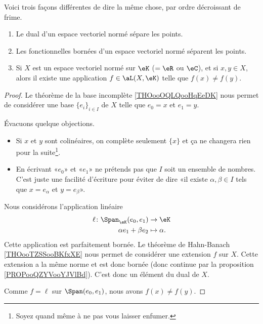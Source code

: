 \begin{corollary}        \label{CORooOBDHooJpiBrs}
	Voici trois façons différentes de dire la même chose, par ordre décroissant de frime.
	\begin{enumerate}
		\item
		      Le dual d'un espace vectoriel normé sépare les points.
		\item
		      Les fonctionnelles bornées d'un espace vectoriel normé séparent les points.
		\item
		      Si \( X\) est un espace vectoriel normé sur \( \eK\) (\( =\eR\) ou \( \eC\)), et si \( x,y\in X\), alors il existe une application \( f\in\aL(X,\eK)\) telle que \( f(x)\neq f(y)\).
	\end{enumerate}
\end{corollary}

\begin{proof}
	Le théorème de la base incomplète \ref{THOooOQLQooHqEeDK} nous permet de considérer une base \( \{ e_i \}_{i\in I}\) de \( X\) telle que \( e_0=x\) et \( e_1=y\).

	Évacuons quelque objections.
	\begin{itemize}
		\item Si \( x\) et \( y\) sont colinéaires, on complète seulement \( \{ x \}\) et ça ne changera rien pour la suite\footnote{Soyez quand même  à ne pas vous laisser enfumer.}.
		\item En écrivant «\( e_0\)» et «\( e_1\)»  ne prétends pas que \( I\) soit un ensemble de nombres. C'est juste une facilité d'écriture pour éviter de dire «il existe \( \alpha,\beta\in I\) tels que \( x=e_{\alpha}\) et \( y=e_{\beta}\)».
	\end{itemize}
	Nous considérons l'application linéaire
	\begin{equation}
		\begin{aligned}
			\ell\colon \Span_{\eK}(e_0,e_1) & \to \eK         \\
			\alpha e_1+\beta e_2            & \mapsto \alpha.
		\end{aligned}
	\end{equation}
	Cette application est parfaitement bornée. Le théorème de Hahn-Banach \ref{THOooTZSSooBKfxXE} nous permet de considérer une extension \( f\) sur \( X\). Cette extension a la même norme et est donc bornée (donc continue par la proposition \ref{PROPooQZYVooYJVlBd}). C'est donc un élément du dual de \( X\).

	Comme \( f=\ell\) sur \( \Span(e_0,e_1)\), nous avons \( f(x)\neq f(y)\).
\end{proof}

